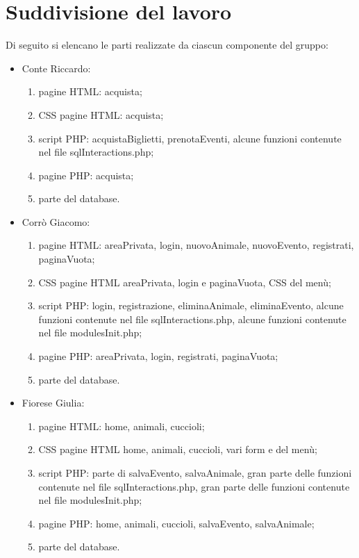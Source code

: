 \section{Suddivisione del lavoro}
Di seguito si elencano le parti realizzate da ciascun componente del gruppo:
\begin{itemize}
    \item Conte Riccardo:
        \begin{enumerate}
        \item pagine HTML: acquista;
        \item CSS pagine HTML: acquista;
        \item script PHP: acquistaBiglietti, prenotaEventi, alcune funzioni contenute nel file sqlInteractions.php;
        \item pagine PHP: acquista;
        \item parte del database.
        \end{enumerate}
    \item Corrò Giacomo:
        \begin{enumerate}
            \item pagine HTML: areaPrivata, login, nuovoAnimale, nuovoEvento, registrati, paginaVuota;
            \item CSS pagine HTML areaPrivata, login e paginaVuota, CSS del menù;
            \item script PHP: login, registrazione, eliminaAnimale, eliminaEvento, alcune funzioni contenute nel file sqlInteractions.php, alcune funzioni contenute nel file modulesInit.php;
            \item pagine PHP: areaPrivata, login, registrati, paginaVuota;
            \item parte del database.
        \end{enumerate}
    \item Fiorese Giulia:
        \begin{enumerate}
            \item pagine HTML: home, animali, cuccioli;
            \item CSS pagine HTML home, animali, cuccioli, vari form e del menù;
            \item script PHP: parte di salvaEvento, salvaAnimale, gran parte delle funzioni contenute nel file sqlInteractions.php, gran parte delle funzioni contenute nel file modulesInit.php;
            \item pagine PHP: home, animali, cuccioli, salvaEvento, salvaAnimale;
            \item parte del database.

\end{enumerate}
\end{itemize}
